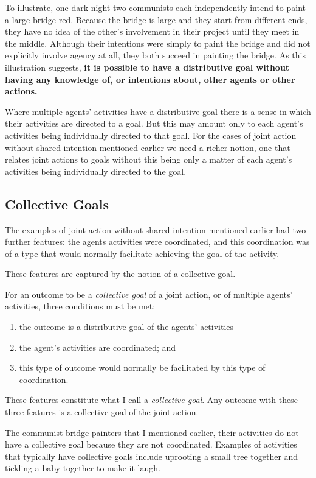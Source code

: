 \documentclass[14pt,a4paper]{extarticle}
\begin{document}
To illustrate, one dark night two communists  each independently intend to paint a large bridge red.   
Because the bridge is large and they start from different ends, they have no idea of the other's involvement in their project until they meet in the middle.  
Although their intentions were simply to paint the bridge and did not explicitly involve agency at all, they both succeed in painting the bridge. 
As this illustration suggests, \textbf{it is possible to have a distributive goal without having any knowledge of, or intentions about, other agents or other actions.}

Where multiple agents' activities have a distributive goal there is a sense in which their activities are directed to a goal.  
But this may amount only to each agent's activities being individually directed to that goal.  
For the cases of joint action without shared intention mentioned earlier we need a richer notion, one that relates joint actions to goals without this being only a matter of each agent's activities being individually directed to the goal.



\subsection{Collective Goals}
\label{section_collective}
The examples of joint action without shared intention mentioned earlier had two further features: the agents activities were coordinated, and this coordination was of a type that would normally facilitate achieving the goal of the activity.

These features are captured by the notion of a collective goal.

For an outcome to be a \emph{collective goal} of a joint action, or of multiple agents' activities, three conditions must be met:
%
\begin{enumerate}
\item the outcome is a distributive goal of the agents' activities
\item the agent's activities are coordinated; and
\item this type of outcome would normally be facilitated by this type of coordination.
\end{enumerate}
%
These features constitute what I call a \emph{collective goal}.  Any outcome with these three features is a collective goal of the joint action.

The communist bridge painters that I mentioned earlier, their activities do not have a collective goal because they are not coordinated.
Examples of activities that typically have collective goals include uprooting a small tree together and tickling a baby together to make it laugh.
\end{document}
